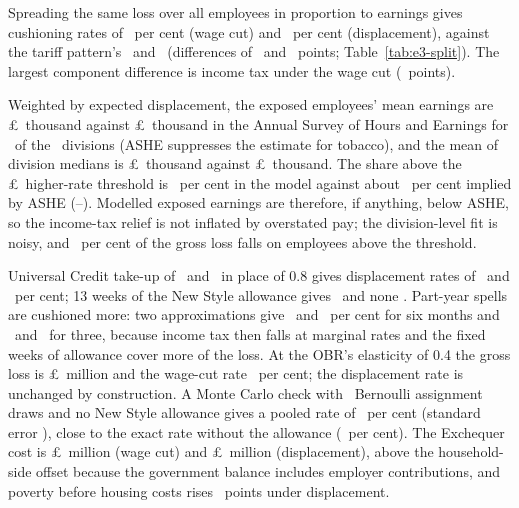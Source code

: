  Spreading the same loss over all employees
in proportion to earnings gives cushioning rates of
\EThreeUnifWageRatePct\ per cent (wage cut) and
\EThreeUnifDispRatePct\ per cent (displacement), against the tariff
pattern's \EThreeWageRatePct\ and \EThreeDispRatePct\ (differences of \EThreeUnifWageGapPts\ and \EThreeUnifDispGapPts\
points; Table~\ref{tab:e3-split}). The largest component difference is
income tax under the wage cut (\EThreeUnifWageTaxGapPts\ points).

 Weighted by expected
displacement, the exposed employees' mean earnings are
\pounds\EThreeAsheModelMeanK\ thousand against
\pounds\EThreeAsheMeanK\ thousand in the Annual Survey of Hours and
Earnings \citep[\EThreeAsheEdition\ edition, uprated
\EThreeAsheUpratingPct\ per cent to 2026--27 by the model's earnings
growth;][]{ashe} for \EThreeAsheDivisions\ of the \EThreeIndDivisions\
divisions (ASHE suppresses the estimate for tobacco), and the
mean of division medians is \pounds\EThreeAsheModelMedianK\ thousand
against \pounds\EThreeAsheMedianK\ thousand. The share above the
\pounds\EThreeHigherRateThreshold\ higher-rate threshold is
\EThreeHigherRateSharePct\ per cent in the model against about
\EThreeAsheHigherRateSharePct\ per cent implied by ASHE
(\EThreeAsheHigherRateLowPct--\EThreeAsheHigherRateHighPct). Modelled
exposed earnings are therefore, if anything, below ASHE, so the
income-tax relief is not inflated by overstated pay; the
division-level fit is noisy, and \EThreeHigherRateLossSharePct\ per
cent of the gross loss falls on employees above the threshold.

 Universal Credit take-up of \EThreeSensTakeupLow\
and \EThreeSensTakeupHigh\ in place of 0.8 gives displacement rates of
\EThreeSensTakeupLowRatePct\ and \EThreeSensTakeupHighRatePct\ per
cent; 13 weeks of the New Style allowance gives
\EThreeSensJsaThirteenRatePct\ and none \EThreeSensJsaZeroRatePct.
Part-year spells are cushioned more: two approximations give
\EThreeSensSixMonthAnnualRatePct\ and \EThreeSensSixMonthMixRatePct\
per cent for six months and \EThreeSensThreeMonthAnnualRatePct\ and
\EThreeSensThreeMonthMixRatePct\ for three, because income tax then falls at marginal rates and the fixed weeks of allowance cover more
of the loss. At the OBR's elasticity of 0.4 the gross loss is
\pounds\EThreeObrLowWageGrossM\ million and the wage-cut rate
\EThreeObrLowWageRatePct\ per cent; the displacement rate is unchanged
by construction. A Monte Carlo check with \EThreeBernDraws\ Bernoulli
assignment draws and no New Style allowance gives a pooled rate of
\EThreeBernRatePooled\ per cent (standard error
\EThreeBernRatePooledSe), close to the exact rate without the
allowance (\EThreeDispNoJsaRatePct\ per cent). The Exchequer cost is
\pounds\EThreeWageExchequerM\ million (wage cut) and
\pounds\EThreeDispExchequerM\ million (displacement), above the
household-side offset because the government balance includes employer
contributions, and poverty before housing costs rises
\EThreeDispPovertyPp\ points under displacement.

